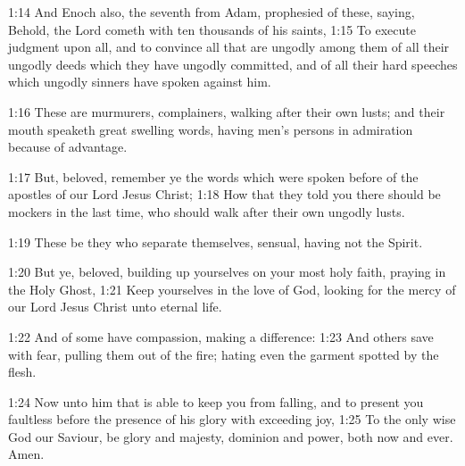 1:14 And Enoch also, the seventh from Adam, prophesied of these, saying, Behold, the Lord cometh with ten thousands of his saints, 1:15 To execute judgment upon all, and to convince all that are ungodly among them of all their ungodly deeds which they have ungodly committed, and of all their hard speeches which ungodly sinners have spoken against him.

1:16 These are murmurers, complainers, walking after their own lusts; and their mouth speaketh great swelling words, having men's persons in admiration because of advantage.

1:17 But, beloved, remember ye the words which were spoken before of the apostles of our Lord Jesus Christ; 1:18 How that they told you there should be mockers in the last time, who should walk after their own ungodly lusts.

1:19 These be they who separate themselves, sensual, having not the Spirit.

1:20 But ye, beloved, building up yourselves on your most holy faith, praying in the Holy Ghost, 1:21 Keep yourselves in the love of God, looking for the mercy of our Lord Jesus Christ unto eternal life.

1:22 And of some have compassion, making a difference: 1:23 And others save with fear, pulling them out of the fire; hating even the garment spotted by the flesh.

1:24 Now unto him that is able to keep you from falling, and to present you faultless before the presence of his glory with exceeding joy, 1:25 To the only wise God our Saviour, be glory and majesty, dominion and power, both now and ever. Amen.

